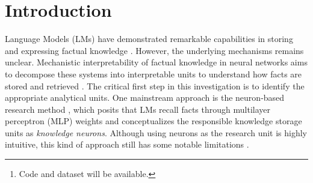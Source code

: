 
\begin{abstract}
Previous studies primarily utilize MLP neurons as units of analysis for understanding the mechanisms of factual knowledge in Language Models (LMs); however, neurons suffer from polysemanticity, leading to limited knowledge expression and poor interpretability. In this paper, we first conduct preliminary experiments to validate that Sparse Autoencoders (SAE) can effectively decompose neurons into features, which serve as alternative analytical units. With this established, our core findings reveal three key advantages of features over neurons: (1) Features exhibit stronger influence on knowledge expression and superior interpretability. (2) Features demonstrate enhanced monosemanticity, showing distinct activation patterns between related and unrelated facts. (3) Features achieve better privacy protection than neurons,  demonstrated through our proposed FeatureEdit method, which significantly outperforms existing neuron-based approaches in erasing privacy-sensitive information from LMs.\footnote{Code and dataset will be available.}.

\end{abstract}


\section{Introduction}
\label{section:Introduction}
Language Models (LMs) have demonstrated remarkable capabilities in storing and expressing factual knowledge \citep{TheC3, openai2024gpt4technicalreport,gemmateam2024gemma2improvingopen}. However, the underlying mechanisms remains unclear. Mechanistic interpretability of factual knowledge in neural networks aims to decompose these systems into interpretable units to understand how facts are stored and retrieved \cite{chen2024knowledgelocalizationmissionaccomplished}. The critical first step in this investigation is to identify the appropriate analytical units.
One mainstream approach is the neuron-based research method \citep{geva2021key-value,dai2022knowledge,chen2024journey}, which posits that LMs recall facts through multilayer perceptron (MLP) weights and conceptualizes the responsible knowledge storage units as \textit{knowledge neurons}.
Although using neurons as the research unit is highly intuitive, this kind of approach still has some notable limitations \citep{hase2023does,niu2024what,chen2024knowledgelocalizationmissionaccomplished}.



